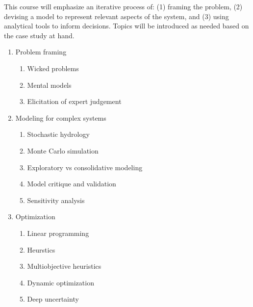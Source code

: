 \documentclass[12pt]{article}
\begin{document}
This course will emphasize an iterative process of: (1) framing the problem, (2) devising a model to represent relevant aspects of the system, and (3) using analytical tools to inform decisions.
Topics will be introduced as needed based on the case study at hand.
\begin{enumerate}
	\item Problem framing
	      \begin{enumerate}
	      	\item Wicked problems \citep{rittel:1973}
	      	\item Mental models
	      	\item Elicitation of expert judgement
	      \end{enumerate}
	\item Modeling for complex systems
	      \begin{enumerate}
	      	\item Stochastic hydrology
	      	\item Monte Carlo simulation
	      	\item Exploratory vs consolidative modeling \citep{bankes:1993}
	      	\item Model critique and validation
	      	\item Sensitivity analysis \citep{pianosi_sensitivity:2016}
	      \end{enumerate}
	\item Optimization
	      \begin{enumerate}
	      	\item Linear programming
	      	\item Heurstics
	      	\item Multiobjective heuristics
	      	\item Dynamic optimization
	      	\item Deep uncertainty
	      \end{enumerate}
\end{enumerate}


\printbibliography
\end{document}
